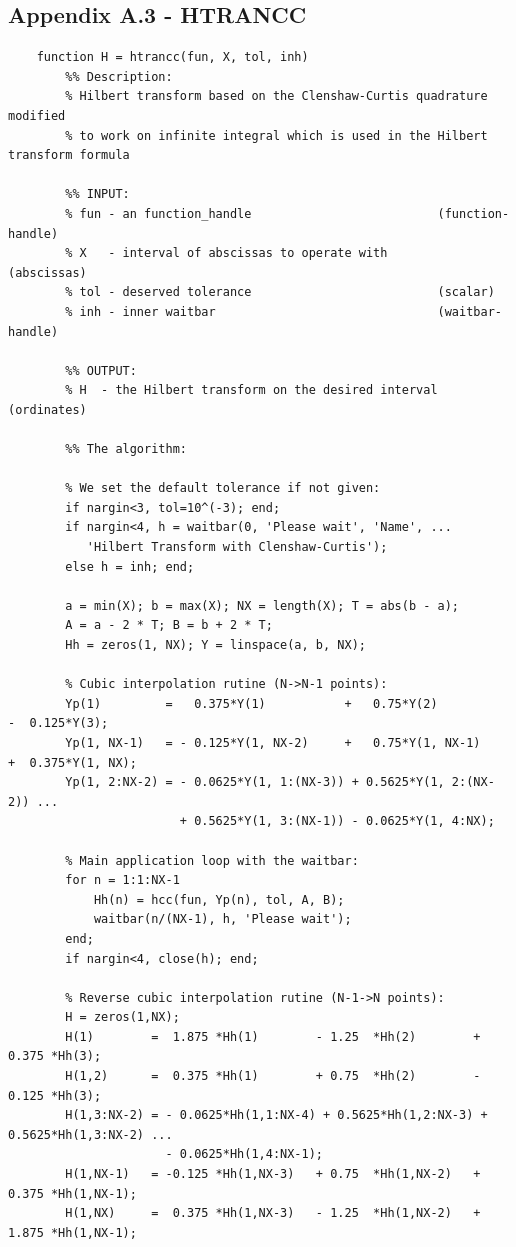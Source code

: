 \documentclass[12pt,twoside,a4paper]{article}
\numberwithin{equation}{subsection}
\numberwithin{figure}{subsection}
\begin{document}
\subsection*{Appendix A.3 - HTRANCC}
\begin{lstlisting}
	function H = htrancc(fun, X, tol, inh)
	    %% Description:
	    % Hilbert transform based on the Clenshaw-Curtis quadrature modified
	    % to work on infinite integral which is used in the Hilbert transform formula
	        
	    %% INPUT:
	    % fun - an function_handle                          (function-handle) 
	    % X   - interval of abscissas to operate with       (abscissas)
	    % tol - deserved tolerance                          (scalar)
	    % inh - inner waitbar                               (waitbar-handle)
	     
	    %% OUTPUT:
	    % H  - the Hilbert transform on the desired interval (ordinates)
	 
	    %% The algorithm:
	    
	    % We set the default tolerance if not given:
	    if nargin<3, tol=10^(-3); end;
	    if nargin<4, h = waitbar(0, 'Please wait', 'Name', ...
	       'Hilbert Transform with Clenshaw-Curtis'); 
        else h = inh; end;
	    
	    a = min(X); b = max(X); NX = length(X); T = abs(b - a);
	    A = a - 2 * T; B = b + 2 * T;
	    Hh = zeros(1, NX); Y = linspace(a, b, NX);
	    
	    % Cubic interpolation rutine (N->N-1 points):
	    Yp(1)         =   0.375*Y(1)           +   0.75*Y(2)           -  0.125*Y(3);
	    Yp(1, NX-1)   = - 0.125*Y(1, NX-2)     +   0.75*Y(1, NX-1)     +  0.375*Y(1, NX);
	    Yp(1, 2:NX-2) = - 0.0625*Y(1, 1:(NX-3)) + 0.5625*Y(1, 2:(NX-2)) ...
	                    + 0.5625*Y(1, 3:(NX-1)) - 0.0625*Y(1, 4:NX);
	    
	    % Main application loop with the waitbar:
	    for n = 1:1:NX-1
	        Hh(n) = hcc(fun, Yp(n), tol, A, B); 
	        waitbar(n/(NX-1), h, 'Please wait');
	    end;
	    if nargin<4, close(h); end;
	    
	    % Reverse cubic interpolation rutine (N-1->N points):
	    H = zeros(1,NX);
	    H(1)        =  1.875 *Hh(1)        - 1.25  *Hh(2)        + 0.375 *Hh(3);
	    H(1,2)      =  0.375 *Hh(1)        + 0.75  *Hh(2)        - 0.125 *Hh(3);
	    H(1,3:NX-2) = - 0.0625*Hh(1,1:NX-4) + 0.5625*Hh(1,2:NX-3) + 0.5625*Hh(1,3:NX-2) ...
	                  - 0.0625*Hh(1,4:NX-1);
	    H(1,NX-1)   = -0.125 *Hh(1,NX-3)   + 0.75  *Hh(1,NX-2)   + 0.375 *Hh(1,NX-1);
	    H(1,NX)     =  0.375 *Hh(1,NX-3)   - 1.25  *Hh(1,NX-2)   + 1.875 *Hh(1,NX-1);
	

\end{lstlisting}
\end{document}
